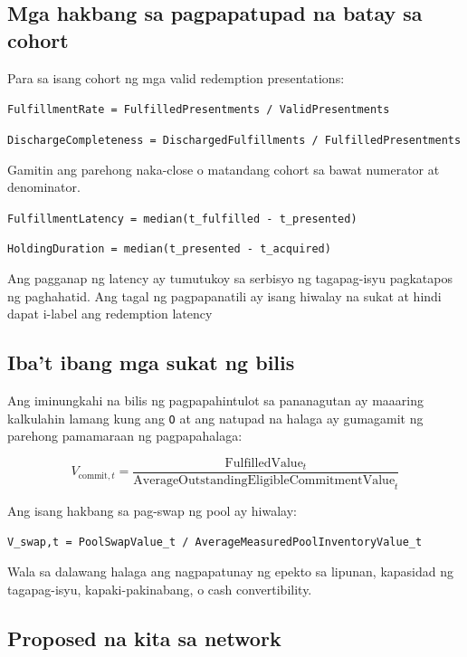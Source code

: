 \documentclass[11pt]{article}
\begin{document}
\subsection*{Mga hakbang sa pagpapatupad na batay sa cohort}

Para sa isang cohort ng mga valid redemption presentations:

\texttt{FulfillmentRate = FulfilledPresentments / ValidPresentments}

\texttt{DischargeCompleteness = DischargedFulfillments / FulfilledPresentments}

Gamitin ang parehong naka-close o matandang cohort sa bawat numerator at denominator.

\texttt{FulfillmentLatency = median(t\_fulfilled - t\_presented)}

\texttt{HoldingDuration = median(t\_presented - t\_acquired)}

Ang pagganap ng latency ay tumutukoy sa serbisyo ng tagapag-isyu pagkatapos ng paghahatid. Ang tagal ng pagpapanatili ay isang hiwalay na sukat at hindi dapat i-label ang redemption latency

\subsection*{Iba't ibang mga sukat ng bilis}

Ang iminungkahi na bilis ng pagpapahintulot sa pananagutan ay maaaring kalkulahin lamang kung ang \texttt{O} at ang natupad na halaga ay gumagamit ng parehong pamamaraan ng pagpapahalaga:

\[
V_{\mathrm{commit},t} = \frac{\mathrm{FulfilledValue}_t}{\mathrm{AverageOutstandingEligibleCommitmentValue}_t}
\]

Ang isang hakbang sa pag-swap ng pool ay hiwalay:

\texttt{V\_swap,t = PoolSwapValue\_t / AverageMeasuredPoolInventoryValue\_t}

Wala sa dalawang halaga ang nagpapatunay ng epekto sa lipunan, kapasidad ng tagapag-isyu, kapaki-pakinabang, o cash convertibility.

\subsection*{Proposed na kita sa network}
\end{document}

